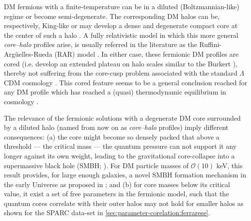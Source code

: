 \begin{asparaenum}[(1)]
    \item DM fermions with a finite-temperature can be in a diluted (Boltzmannian-like) regime or become semi-degenerate. The corresponding DM halos can be, respectively, King-like or may develop a dense and degenerate compact core at the center of such a halo \citep{2015PhRvD..92l3527C,2021MNRAS.502.4227A}. A fully relativistic model in which this more general \textit{core}--\textit{halo} profiles arise, is usually referred in the literature as the Ruffini-Argüelles-Rueda (RAR) model \citep{2015MNRAS.451..622R,2018PDU....21...82A,2019PDU....24..278A,2020A&A...641A..34B,2021MNRAS.505L..64B,2021MNRAS.502.4227A,2022IJMPD..3130002A,2022MNRAS.511L..35A}. In either case, these fermionic DM profiles are cored (i.e. develop an extended plateau on halo scales similar to the Burkert ), thereby not suffering from the core-cusp problem associated with the standard $\Lambda$CDM cosmology \citep{2017ARA&A..55..343B}. This cored feature seems to be a general conclusion reached for any DM profile which has reached a (quasi) thermodynamic equilibrium in cosmology \citep{2021MNRAS.504.2832S}.

    \item The relevance of the fermionic solutions with a degenerate DM core surrounded by a diluted halo (named from now on as \textit{core}--\textit{halo} profiles) imply different consequences: (a) the core might become so densely packed that above a threshold --- the critical mass --- the quantum pressure can not support it any longer against its own weight, leading to the gravitational core-collapse into a supermassive black hole (SMBH;  \citealp{2020EPJB...93..208A,2021MNRAS.502.4227A}). For DM particle masses of $\mathcal{O}(10)$ keV, this result provides, for large enough galaxies, a novel SMBH formation mechanism in the early Universe as proposed in \citet{2021MNRAS.502.4227A}; and (b) for core masses below its critical value, it exist a set of free parameters in the fermionic model, such that the quantum cores correlate with their outer halos \citep{2019PDU....24..278A}  may not hold for smaller halos as shown for the SPARC data-set in \ref{sec:parameter-corelation:ferrarese}.


\end{asparaenum}
